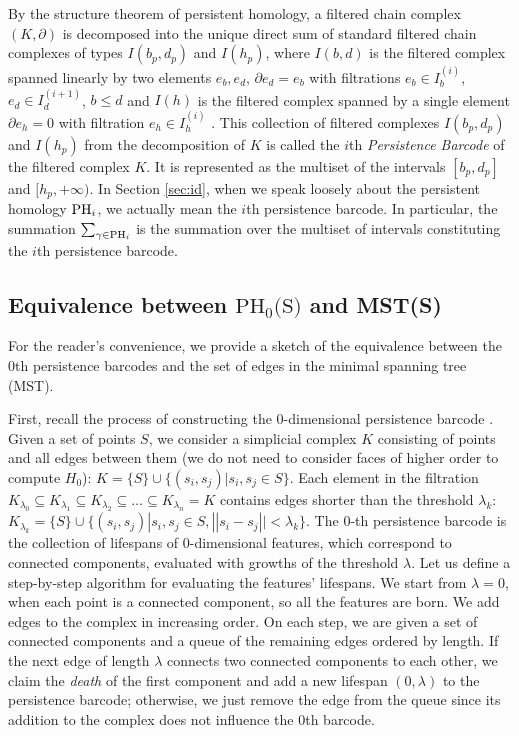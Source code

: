 \documentclass{article}
\begin{document}
By the structure theorem of persistent homology, a filtered chain complex \((K,\partial)\)  is decomposed into the unique direct sum of standard filtered chain complexes of types \(I(b_p,d_p)\) and  \(I(h_p)\), where \(I(b,d)\)
is the filtered complex spanned linearly by two elements \(e_b,e_d,\,\partial e_d=e_b\) with filtrations \(e_b\in I^{(i)}_b\), \(e_d\in I^{(i+1)}_d\), $b\leq d$ and \(I(h)\) is the filtered complex spanned by a single element \(\partial e_h=0\) with filtration \(e_h\in I^{(i)}_h\) \citep{barannikov1994}. This collection of filtered complexes \(I(b_p,d_p)\) and  \(I(h_p)\) from the decomposition of $K$ is called the $i$th \emph{Persistence Barcode} of the filtered complex \(K\). It is represented as the multiset of the intervals  \([b_p,d_p]\) and  \([h_p,+\infty)\). In Section \ref{sec:id}, when we speak loosely about the  persistent homology $\mathrm{PH}_{i}$, we actually mean the $i$th persistence barcode. In particular, the summation $\sum\nolimits_{\gamma \in \mathrm{PH}_{i}} $ is the summation  over the multiset of intervals constituting the $i$th persistence barcode.

\subsection{Equivalence between $\textrm{PH}_0\textrm{(S)}$ and MST(S)}

For the reader's convenience, we provide a sketch of the equivalence between the $0$th persistence barcodes and the set of edges in the minimal spanning tree (MST).

First, recall the process of constructing the $0$-dimensional persistence barcode \citep{adams2020fractal}. Given a set of points $S$, we consider a simplicial complex $K$ consisting of points and all edges between them (we do not need to consider faces of higher order to compute $H_0$): $K=\{S\}\cup\{(s_i, s_j)| s_i, s_j\in S\}$. Each element in the filtration \(
 K_{\lambda_0} \subseteq K_{\lambda_1} \subseteq K_{\lambda_2} \subseteq \ldots \subseteq K_{\lambda_n} = K
\) contains edges shorter than the threshold $\lambda_k$: $K_{\lambda_k} = \{S\}\cup\{(s_i, s_j) | s_i, s_j\in S, ||s_i-s_j||<\lambda_k\}$. The $0$-th persistence barcode is the collection of lifespans of $0$-dimensional features, which correspond to connected components, evaluated with growths of the threshold $\lambda$. Let us define a step-by-step algorithm for evaluating the features' lifespans. We start from $\lambda=0$, when each point is a connected component, so all the features are born. We add edges to the complex in increasing order. On each step, we are given a set of connected components and a queue of the remaining edges ordered by length. If the next edge of length $\lambda$ connects two connected components to each other, we claim the \emph{death} of the first component and add a new lifespan $(0,\lambda)$ to the persistence barcode; otherwise, we just remove the edge from the queue since its addition to the complex does not influence the $0$th barcode.  
\end{document}
